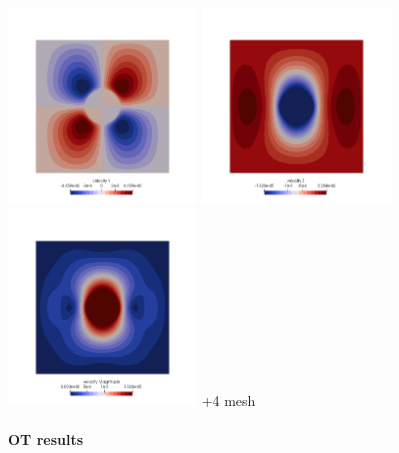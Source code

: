 \begin{center}
\includegraphics[width=5cm]{images/stokes_sphere3D/aspect_amr_NS/v}
\includegraphics[width=5cm]{images/stokes_sphere3D/aspect_amr_NS/w}
\includegraphics[width=5cm]{images/stokes_sphere3D/aspect_amr_NS/vel}
{+4 mesh}
\end{center}



\newpage
\paragraph{OT results}

